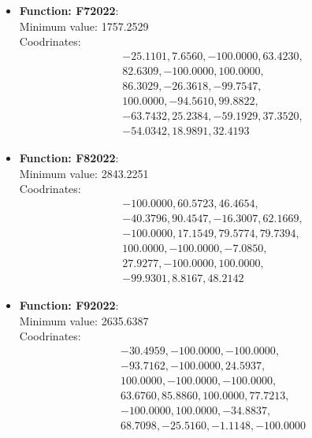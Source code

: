 \documentclass{article}
\begin{document}
\begin{itemize}
  \item \textbf{Function: F72022}: \\
    Minimum value: 1757.2529 \\
    Coodrinates:
    \[
      \begin{aligned}
        & -25.1101, 7.6560, -100.0000, 63.4230, \\
        & 82.6309, -100.0000, 100.0000, \\
        & 86.3029, -26.3618, -99.7547, \\
        & 100.0000, -94.5610, 99.8822, \\
        & -63.7432, 25.2384, -59.1929, 37.3520, \\
        & -54.0342, 18.9891, 32.4193
      \end{aligned}
    \]

  \item \textbf{Function: F82022}: \\
    Minimum value: 2843.2251 \\
    Coodrinates:
    \[
      \begin{aligned}
        & -100.0000, 60.5723, 46.4654, \\
        & -40.3796, 90.4547, -16.3007, 62.1669, \\
        & -100.0000, 17.1549, 79.5774, 79.7394, \\
        & 100.0000, -100.0000, -7.0850, \\
        & 27.9277, -100.0000, 100.0000, \\
        & -99.9301, 8.8167, 48.2142
      \end{aligned}
    \]

  \item \textbf{Function: F92022}: \\
    Minimum value: 2635.6387 \\
    Coodrinates:
    \[
      \begin{aligned}
        & -30.4959, -100.0000, -100.0000, \\
        & -93.7162, -100.0000, 24.5937, \\
        & 100.0000, -100.0000, -100.0000, \\
        & 63.6760, 85.8860, 100.0000, 77.7213, \\
        & -100.0000, 100.0000, -34.8837, \\
        & 68.7098, -25.5160, -1.1148, -100.0000
      \end{aligned}
    \]


\end{itemize}
\end{document}
